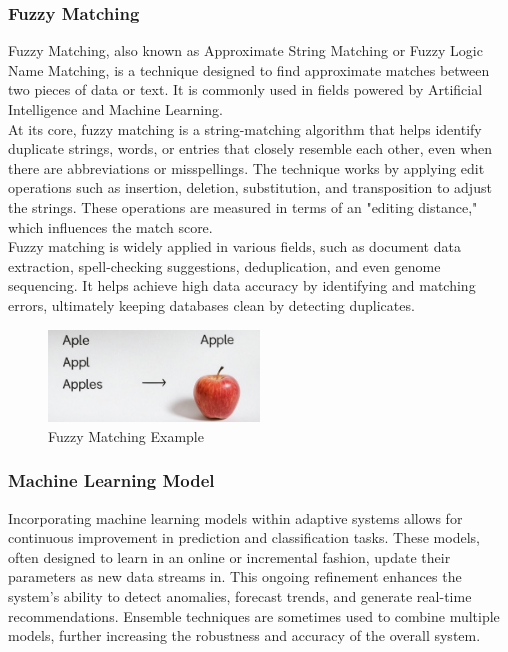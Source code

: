         \subsubsection{Fuzzy Matching}
        Fuzzy Matching, also known as Approximate String Matching or Fuzzy Logic Name Matching, is a technique designed to find approximate matches between two pieces of data or text. It is commonly used in fields powered by Artificial Intelligence and Machine Learning.\\

        At its core, fuzzy matching is a string-matching algorithm that helps identify duplicate strings, words, or entries that closely resemble each other, even when there are abbreviations or misspellings. The technique works by applying edit operations such as insertion, deletion, substitution, and transposition to adjust the strings. These operations are measured in terms of an "editing distance," which influences the match score.\\
        
        Fuzzy matching is widely applied in various fields, such as document data extraction, spell-checking suggestions, deduplication, and even genome sequencing. It helps achieve high data accuracy by identifying and matching errors, ultimately keeping databases clean by detecting duplicates.\autocite{Nieters2024Dec}

        \begin{figure}[H]
            \centering
            \includegraphics[width=0.5\textwidth]{images/AdminPanel/FuzzyMatching.png}
            \caption{Fuzzy Matching Example}
            \label{fig:fuzzy-matching}
        \end{figure}

        \subsubsection{Machine Learning Model}
        Incorporating machine learning models within adaptive systems allows for continuous improvement in prediction and classification tasks. These models, often designed to learn in an online or incremental fashion, update their parameters as new data streams in. This ongoing refinement enhances the system's ability to detect anomalies, forecast trends, and generate real-time recommendations. Ensemble techniques are sometimes used to combine multiple models, further increasing the robustness and accuracy of the overall system.

